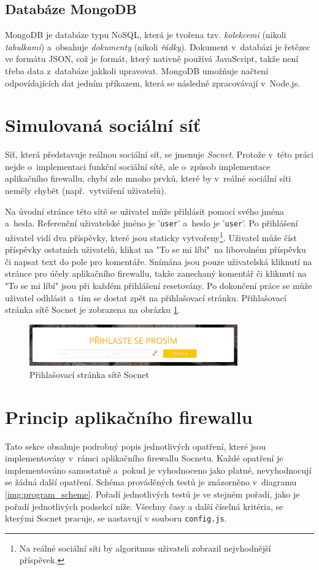 \subsection*{Databáze MongoDB}
MongoDB je databáze typu NoSQL, která je tvořena tzv. \textit{kolekcemi} (nikoli \textit{tabulkami}) a~obsahuje \textit{dokumenty} (nikoli \textit{řádky}). Dokument v~databázi je řetězec ve formátu JSON, což je formát, který nativně používá JavaScript, takže není třeba data z~databáze jakkoli upravovat. MongoDB umožňuje načtení odpovídajících dat jedním příkazem, která se následně zpracovávají v~Node.js.

\section{Simulovaná sociální síť}
Síť, která představuje reálnou sociální síť, se jmenuje \textit{Socnet}. Protože v~této práci nejde o~implementaci funkční sociální sítě, ale o~způsob implementace aplikačního firewallu, chybí zde mnoho prvků, které by v~reálné sociální síti neměly chybět (např.~vytváření uživatelů).

Na úvodní stránce této sítě se uživatel může přihlásit pomocí svého jména a~hesla. Referenční uživatelské jméno je '\texttt{user}' a~heslo je '\texttt{user}'. Po přihlášení uživatel vidí dva příspěvky, které jsou staticky vytvořeny\footnote{Na reálné sociální síti by algoritmus uživateli zobrazil nejvhodnější příspěvek.}. Uživatel může číst příspěvky ostatních uživatelů, klikat na "To se mi líbí"~na libovolném příspěvku či napsat text do pole pro komentáře. Snímána jsou pouze uživatelská kliknutí na stránce pro účely aplikačního firewallu, takže zanechaný komentář či kliknutí na "To se mi líbí" jsou při každém přihlášení resetovány. Po dokončení práce se může uživatel odhlásit a~tím se dostat zpět na přihlašovací stránku. Přihlašovací stránka sítě Socnet je zobrazena na obrázku \ref{img:socnet_intro}.

\begin{figure}[H]
	\centering
	\includegraphics[width=0.8\textwidth]{images/socnet_intro.jpg}
	\caption{Přihlašovací stránka sítě Socnet}
	\label{img:socnet_intro}
\end{figure}

\section{Princip aplikačního firewallu}
Tato sekce obsahuje podrobný popis jednotlivých opatření, které jsou implementovány v~rámci aplikačního firewallu Socnetu. Každé opatření je implementováno samostatně a~pokud je vyhodnoceno jako platné, nevyhodnocují se žádná další opatření. Schéma prováděných testů je znázorněno v~diagramu \ref{img:program_scheme}. Pořadí jednotlivých testů je ve stejném pořadí, jako je pořadí jednotlivých podsekcí níže. Všechny časy a další číselná kritéria, se kterými Socnet pracuje, se nastavují v souboru \texttt{config.js}.

